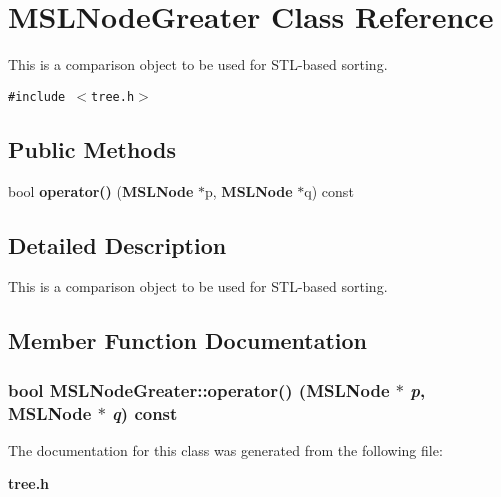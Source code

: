 \section{MSLNode\-Greater  Class Reference}
\label{class_MSLNodeGreater}
This is a comparison object to be used for STL-based sorting. 


{\tt \#include $<$tree.h$>$}

\subsection*{Public Methods}
\begin{CompactItemize}
\item 
bool {\bf operator()} ({\bf MSLNode} $\ast$p, {\bf MSLNode} $\ast$q) const
\end{CompactItemize}


\subsection{Detailed Description}
This is a comparison object to be used for STL-based sorting.



\subsection{Member Function Documentation}
\subsubsection{\setlength{\rightskip}{0pt plus 5cm}bool MSLNode\-Greater::operator() ({\bf MSLNode} $\ast$ {\em p}, {\bf MSLNode} $\ast$ {\em q}) const\hspace{0.3cm}{\tt  [inline]}}\label{class_MSLNodeGreater_a0}




The documentation for this class was generated from the following file:\begin{CompactItemize}
\item 
{\bf tree.h}\end{CompactItemize}
